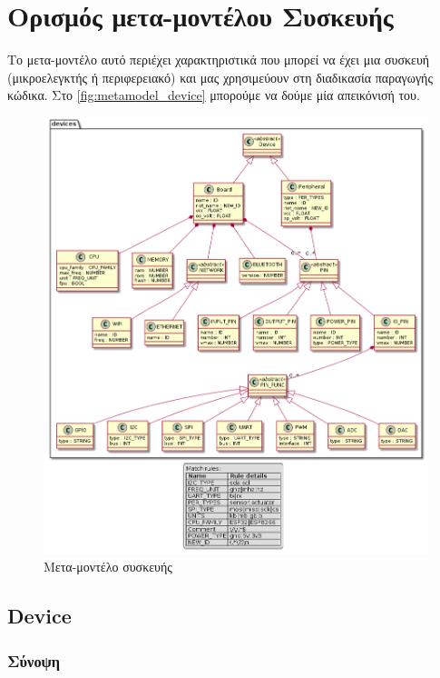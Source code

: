 \section{Ορισμός μετα-μοντέλου Συσκευής}
\label{sec:metamodel_device}

Το μετα-μοντέλο αυτό περιέχει χαρακτηριστικά που μπορεί να έχει μια συσκευή (μικροελεγκτής ή περιφερειακό) και μας χρησιμεύουν στη διαδικασία παραγωγής κώδικα. Στο \autoref{fig:metamodel_device} μπορούμε να δούμε μία απεικόνισή του.

\begin{figure}[!ht]
	\centering
	\includegraphics[height=0.8\textheight]{./images/chapter5/metamodel_device.png}
	\caption{Μετα-μοντέλο συσκευής}
	\label{fig:metamodel_device}
\end{figure}

\subsection{Device}
\label{subsec:device}

\subsubsection*{Σύνοψη}

